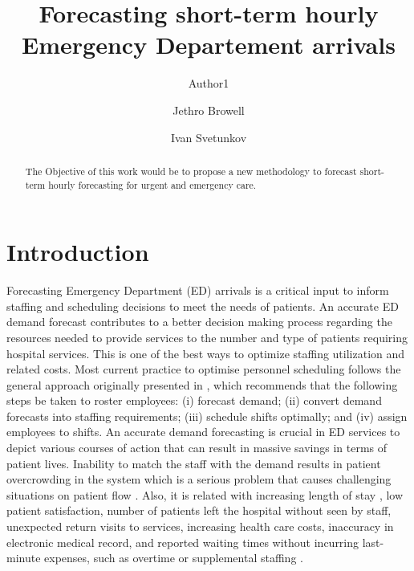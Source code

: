 \documentclass[]{elsarticle} %
\begin{document}
\begin{frontmatter}

  \title{Forecasting short-term hourly Emergency Departement arrivals}
    \author[University1]{Author1}
    \author[School of Mathematics and Statistics, University of Glasgow, UK]{Jethro Browell}
    \author[Centre for Marketing Analytics and Forecasting, Lancaster University, UK]{Ivan Svetunkov}
      \address[University1]{Cardiff business school, 3 Colum Drive, CF10 3EU, Cardiff}
    \address[University2]{adress2}
    \address[University3]{adress3}
  
  \begin{abstract}
  The Objective of this work would be to propose a new methodology to forecast short-term hourly forecasting for urgent and emergency care.
  \end{abstract}
  
 \end{frontmatter}

\hypertarget{introduction}{%
\section{Introduction}\label{introduction}}

Forecasting Emergency Department (ED) arrivals is a critical input to inform staffing and scheduling decisions to meet the needs of patients. An accurate ED demand forecast contributes to a better decision making process regarding the resources needed to provide services to the number and type of patients requiring hospital services. This is one of the best ways to optimize staffing utilization and related costs. Most current practice to optimise personnel scheduling follows the general approach originally presented in \citet{vile2016time}, which recommends that the following steps be taken to roster employees: (i) forecast demand; (ii) convert demand forecasts into staffing requirements; (iii) schedule shifts optimally; and (iv) assign employees to shifts. An accurate demand forecasting is crucial in ED services to depict various courses of action that can result in massive savings in terms of patient lives. Inability to match the staff with the demand results in patient overcrowding in the system which is a serious problem that causes challenging situations on patient flow \citep{derlet2002overcrowding}. Also, it is related with increasing length of stay \citep{muhammet2015forecasting}, low patient satisfaction, number of patients left the hospital without seen by staff, unexpected return visits to services, increasing health care costs, inaccuracy in electronic medical record, and reported waiting times without incurring last-minute expenses, such as overtime or supplemental staffing \citep{rostami2020anticipating}.
\end{document}
